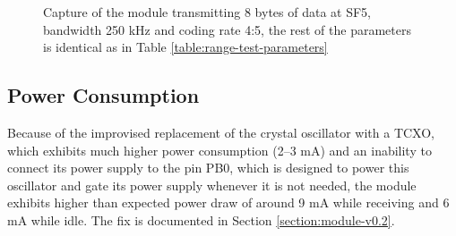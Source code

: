 \begin{figure}[p]
    \centering
     \hfil
    \caption{\label{fig:rf-power}Capture of the module transmitting 8 bytes of data at SF5, bandwidth 250 kHz and coding rate 4:5, the rest of the parameters is identical as in Table \ref{table:range-test-parameters}}
\end{figure}

\subsection{Power Consumption}
Because of the improvised replacement of the crystal oscillator with a TCXO, which exhibits much higher power consumption (2--3 mA) and an inability to connect its power supply to the pin PB0, which is designed to power this oscillator and gate its power supply whenever it is not needed, the module exhibits higher than expected power draw of around 9 mA while receiving and 6 mA while idle. The fix is documented in Section \ref{section:module-v0.2}.


